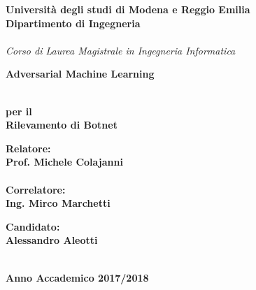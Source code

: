 \documentclass[12pt,a4paper,oneside,onecolumn,openright]{book}
\begin{document}
\begin{titlepage}
\begin{center}
{
    \large
    \textbf{Università  degli studi di Modena e Reggio Emilia} \\
   	\textbf{Dipartimento di Ingegneria} \\
    \hspace*{0cm} \hrulefill \hspace*{0cm} \\
   	\emph{Corso di Laurea Magistrale in Ingegneria Informatica}
    
  
  
 		\huge{\bf Adversarial Machine Learning}}\\
		\vspace{3mm}
		{\huge{\bf  per il}}\\
		\vspace{3mm}
		{\huge{\bf Rilevamento di Botnet}}\\
		\vspace{3mm}
		\vspace{3mm}
		
		\end{center}
		
\vspace{40mm}
\par
\noindent
\begin{minipage}[t]{0.47\textwidth}
{\large{\bf Relatore:\\
Prof.
Michele Colajanni}}\\ 
\\
{\large{\bf Correlatore:\\
Ing. Mirco Marchetti}}
\end{minipage}
\hfill
\begin{minipage}[t]{0.47\textwidth}\raggedleft
{\large{\bf Candidato:\\
Alessandro Aleotti}}
\end{minipage}
\vspace{20mm}
\begin{center}
\hspace*{0cm} \hrulefill \hspace*{0cm} \\
{\large{\bf 
Anno Accademico 2017/2018}}
\end{center}

\end{titlepage}
\end{document}
